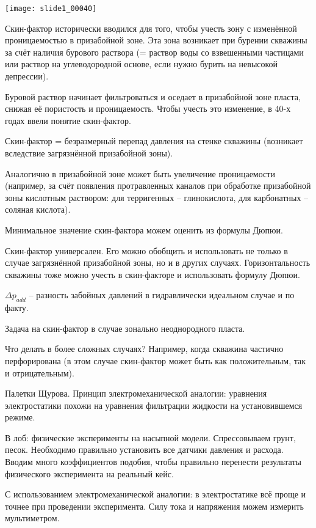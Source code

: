 \documentclass[main.tex]{subfiles}
\begin{document}
\texttt{[image: slide1\_00040]}

Скин-фактор исторически вводился для того, чтобы учесть зону с изменённой проницаемостью в призабойной зоне. Эта зона возникает при бурении скважины за счёт наличия бурового раствора (= раствор воды со взвешенными частицами или раствор на углеводородной основе, если нужно бурить на невысокой депрессии).

Буровой раствор начинает фильтроваться и оседает в призабойной зоне пласта, снижая её пористость и проницаемость. Чтобы учесть это изменение, в 40-х годах ввели понятие скин-фактор.

Скин-фактор = безразмерный перепад давления на стенке скважины (возникает вследствие загрязнённой призабойной зоны).

Аналогично в призабойной зоне может быть увеличение проницаемости (например, за счёт появления протравленных каналов при обработке призабойной зоны кислотным раствором: для терригенных  -- глинокислота, для карбонатных -- соляная кислота).

Минимальное значение скин-фактора можем оценить из формулы Дюпюи.


Скин-фактор универсален. Его можно обобщить и использовать не только в случае загрязнённой призабойной зоны, но и в других случаях. Горизонтальность скважины тоже можно учесть в скин-факторе и использовать формулу Дюпюи.

$\Delta p_{add}$ -- разность забойных давлений в гидравлически идеальном случае и по факту.


Задача на скин-фактор в случае зонально неоднородного пласта.


Что делать в более сложных случаях? Например, когда скважина частично перфорирована (в этом случае скин-фактор может быть как положительным, так и отрицательным).

Палетки Щурова. Принцип электромеханической аналогии: уравнения электростатики похожи на уравнения фильтрации жидкости на установившемся режиме.

В лоб: физические эксперименты на насыпной модели. Спрессовываем грунт, песок. Необходимо правильно установить все датчики давления и расхода. Вводим много коэффициентов подобия, чтобы правильно перенести результаты физического эксперимента на реальный кейс.

С использованием электромеханической аналогии: в электростатике всё проще и точнее при проведении эксперимента. Силу тока и напряжения можем измерить мультиметром.
\end{document}
